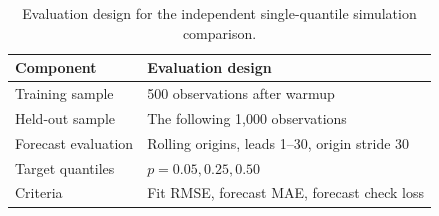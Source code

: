 \begin{table}[!htbp]
\centering
\small
\begin{tabular}{@{}ll@{}}
\toprule
Component & Evaluation design \\
\midrule
Training sample & 500 observations after warmup \\
Held-out sample & The following 1,000 observations \\
Forecast evaluation & Rolling origins, leads 1--30, origin stride 30 \\
Target quantiles & $p=0.05,0.25,0.50$ \\
Criteria & Fit RMSE, forecast MAE, forecast check loss \\
\bottomrule
\end{tabular}
\caption{Evaluation design for the independent single-quantile simulation comparison.}
\label{tab:simulation-500obs-protocol}
\end{table}
